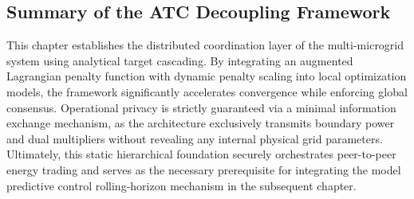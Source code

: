 \subsection{Summary of the ATC Decoupling Framework}

This chapter establishes the distributed coordination layer of the multi-microgrid system using analytical target cascading. By integrating an augmented Lagrangian penalty function with dynamic penalty scaling into local optimization models, the framework significantly accelerates convergence while enforcing global consensus. Operational privacy is strictly guaranteed via a minimal information exchange mechanism, as the architecture exclusively transmits boundary power and dual multipliers without revealing any internal physical grid parameters. Ultimately, this static hierarchical foundation securely orchestrates peer-to-peer energy trading and serves as the necessary prerequisite for integrating the model predictive control rolling-horizon mechanism in the subsequent chapter.
